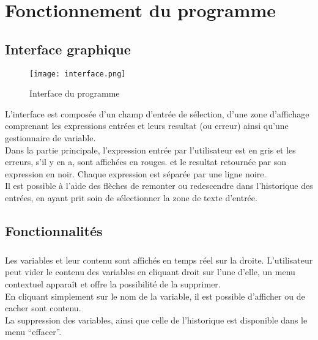 \chapter{Fonctionnement du programme}
    \section{Interface graphique}
        \begin{figure}[h]
            \begin{center}
                \texttt{[image: interface.png]}
            \end{center}

            \caption{Interface du programme}
            \label{Interface du programme}
        \end{figure}

    L'interface est composée d'un champ d'entrée de sélection, d'une zone d'affichage comprenant les expressions entrées et leurs resultat (ou erreur) ainsi qu'une gestionnaire de variable.
    \\ Dans la partie principale, l'expression entrée par l'utilisateur est en gris et les erreurs, s'il y en a, sont affichées en rouges. et le resultat retournée par son expression en noir. Chaque expression est séparée par une ligne noire.
    \\ Il est possible à l'aide des flèches de remonter ou redescendre dans l'historique des entrées, en ayant prit soin de sélectionner la zone de texte d'entrée.
 

    \newpage

    \section{Fonctionnalités}
        \paragraph{}
            Les variables et leur contenu sont affichés en temps réel sur la droite. L'utilisateur peut vider le contenu des variables en cliquant droit sur l'une d'elle, un menu contextuel apparaît et offre la possibilité de la supprimer.
            \\ En cliquant simplement sur le nom de la variable, il est possible d'afficher ou de cacher sont contenu.
            \\ La suppression des variables, ainsi que celle de l'historique est disponible dans le menu ``effacer''.

